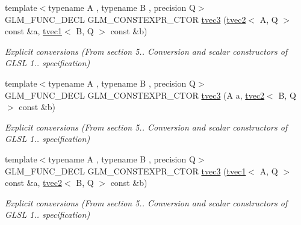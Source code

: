 \begin{DoxyCompactItemize}
\mbox{\label{structglm_1_1tvec3_a06dbab521ff9e13874fcf9c2ccac832f}} 
{\footnotesize template$<$typename A , typename B , precision Q$>$ }\\G\+L\+M\+\_\+\+F\+U\+N\+C\+\_\+\+D\+E\+CL G\+L\+M\+\_\+\+C\+O\+N\+S\+T\+E\+X\+P\+R\+\_\+\+C\+T\+OR \hyperlink{structglm_1_1tvec3_a06dbab521ff9e13874fcf9c2ccac832f}{tvec3} (\hyperlink{structglm_1_1tvec2}{tvec2}$<$ A, Q $>$ const \&a, \hyperlink{structglm_1_1tvec1}{tvec1}$<$ B, Q $>$ const \&b)
\begin{DoxyCompactList}\small\item\em Explicit conversions (From section 5.. Conversion and scalar constructors of G\+L\+SL 1.. specification) \end{DoxyCompactList}\item 
\mbox{\label{structglm_1_1tvec3_ac78c68860f00256ff44c73e7917d70f5}} 
{\footnotesize template$<$typename A , typename B , precision Q$>$ }\\G\+L\+M\+\_\+\+F\+U\+N\+C\+\_\+\+D\+E\+CL G\+L\+M\+\_\+\+C\+O\+N\+S\+T\+E\+X\+P\+R\+\_\+\+C\+T\+OR \hyperlink{structglm_1_1tvec3_ac78c68860f00256ff44c73e7917d70f5}{tvec3} (A a, \hyperlink{structglm_1_1tvec2}{tvec2}$<$ B, Q $>$ const \&b)
\begin{DoxyCompactList}\small\item\em Explicit conversions (From section 5.. Conversion and scalar constructors of G\+L\+SL 1.. specification) \end{DoxyCompactList}\item 
\mbox{\label{structglm_1_1tvec3_a723d47b43e28307cfd4fdb806379fd89}} 
{\footnotesize template$<$typename A , typename B , precision Q$>$ }\\G\+L\+M\+\_\+\+F\+U\+N\+C\+\_\+\+D\+E\+CL G\+L\+M\+\_\+\+C\+O\+N\+S\+T\+E\+X\+P\+R\+\_\+\+C\+T\+OR \hyperlink{structglm_1_1tvec3_a723d47b43e28307cfd4fdb806379fd89}{tvec3} (\hyperlink{structglm_1_1tvec1}{tvec1}$<$ A, Q $>$ const \&a, \hyperlink{structglm_1_1tvec2}{tvec2}$<$ B, Q $>$ const \&b)
\begin{DoxyCompactList}\small\item\em Explicit conversions (From section 5.. Conversion and scalar constructors of G\+L\+SL 1.. specification) \end{DoxyCompactList}\item 
\mbox{\label{structglm_1_1tvec3_a63301c5a33a1fd31f0046f8c24eb6184}} 

\end{DoxyCompactItemize}
